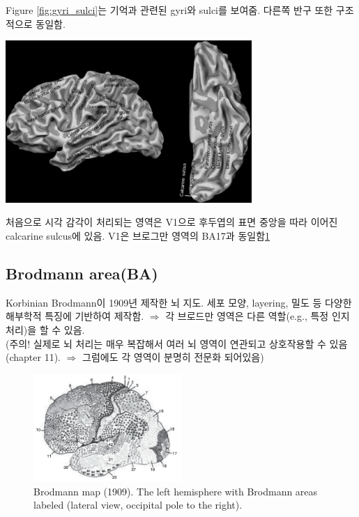 \documentclass[../note.tex]{subfiles}
\begin{document}
{  Figure \ref{fig:gyri_sulci}는 기억과 관련된 gyri와 sulci를 보여줌. 다른쪽 반구 또한 구조적으로 동일함.
  \begin{center}
    \includegraphics[width=0.7\textwidth]{image/gyri_sulci}
    \label{fig:gyri_sulci}
  \end{center}
  
  처음으로 시각 감각이 처리되는 영역은 V1으로 후두엽의 표면 중앙을 따라 이어진 calcarine sulcus에 있음. V1은 브로그만 영역의 BA17과 동일함\ref{fig:brodmann_map}
}

\subsection{Brodmann area(BA)}
Korbinian Brodmann이 1909년 제작한 뇌 지도.
세포 모양, layering, 밀도 등 다양한 해부학적 특징에 기반하여 제작함.
$\Rightarrow$ 각 브로드만 영역은 다른 역할(e.g., 특정 인지 처리)을 할 수 있음.\\
(주의! 실제로 뇌 처리는 매우 복잡해서 여러 뇌 영역이 연관되고 상호작용할 수 있음(chapter 11).
$\Rightarrow$ 그럼에도 각 영역이 분명히 전문화 되어있음)

\begin{figure}[h]
  \centering
  \includegraphics[width=0.5\textwidth]{image/brodmann_map}
  \caption{Brodmann map (1909). The left hemisphere with Brodmann areas labeled
(lateral view, occipital pole to the right).}
  \label{fig:brodmann_map}
\end{figure}
\end{document}
